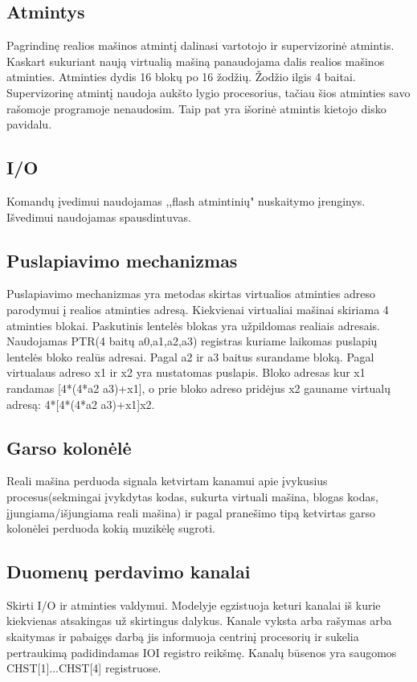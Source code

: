 \documentclass[oneside]{VUMIFPSkursinis}
\begin{document}
\subsection{Atmintys}
Pagrindinę realios mašinos atmintį dalinasi vartotojo ir supervizorinė atmintis. Kaskart sukuriant naują virtualią mašiną panaudojama dalis realios mašinos atminties. Atminties dydis 16 blokų po 16 žodžių. Žodžio ilgis 4 baitai. Supervizorinę atmintį naudoja aukšto lygio procesorius, tačiau šios atminties savo rašomoje programoje nenaudosim. Taip pat yra išorinė atmintis kietojo disko pavidalu.

\subsection{I/O}
Komandų įvedimui naudojamas ,,flash atmintinių" nuskaitymo įrenginys. Išvedimui naudojamas spausdintuvas.

\subsection{Puslapiavimo mechanizmas}
Puslapiavimo mechanizmas yra metodas skirtas virtualios atminties adreso parodymui į realios atminties adresą. Kiekvienai virtualiai mašinai skiriama 4 atminties blokai. Paskutinis lentelės blokas yra užpildomas realiais adresais. Naudojamas PTR(4 baitų a0,a1,a2,a3) registras kuriame laikomas puslapių lentelės bloko realūs adresai. Pagal a2 ir a3 baitus surandame bloką. Pagal virtualaus adreso x1 ir x2 yra nustatomas puslapis. Bloko adresas kur x1 randamas [4*(4*a2 a3)+x1], o prie bloko adreso pridėjus x2 gauname virtualų adresą: 4*[4*(4*a2 a3)+x1]x2.

\subsection{Garso kolonėlė}
Reali mašina perduoda signala ketvirtam kanamui apie įvykusius procesus(sekmingai įvykdytas kodas, sukurta virtuali mašina, blogas kodas, įjungiama/išjungiama reali mašina) ir pagal pranešimo tipą ketvirtas garso kolonėlei perduoda kokią muzikėlę sugroti.

\subsection{Duomenų perdavimo kanalai}
Skirti I/O ir atminties valdymui. Modelyje egzistuoja keturi kanalai iš kurie kiekvienas atsakingas už skirtingus dalykus. Kanale vyksta arba rašymas arba skaitymas ir pabaigęs darbą jis informuoja centrinį procesorių ir sukelia pertraukimą padidindamas IOI registro reikšmę. Kanalų būsenos yra saugomos CHST[1]...CHST[4] registruose.
\end{document}
